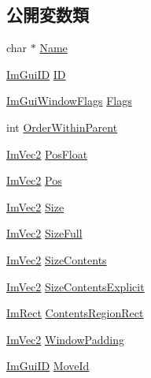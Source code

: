 \subsection*{公開変数類}
\begin{DoxyCompactItemize}
\item 
char $\ast$ \mbox{\hyperlink{struct_im_gui_window_ab44252eb7d02d3f38249f5bac605037c}{Name}}
\item 
\mbox{\hyperlink{imgui_8h_a1785c9b6f4e16406764a85f32582236f}{Im\+Gui\+ID}} \mbox{\hyperlink{struct_im_gui_window_a5976b8d78bcc543ad7f23561f5cf0b8f}{ID}}
\item 
\mbox{\hyperlink{imgui_8h_a0b8e067ab4f7a818828c8d89e531addc}{Im\+Gui\+Window\+Flags}} \mbox{\hyperlink{struct_im_gui_window_a7c29e810a533b9a647cce5d93d45057f}{Flags}}
\item 
int \mbox{\hyperlink{struct_im_gui_window_a81cb24c35445e1259367284701253c79}{Order\+Within\+Parent}}
\item 
\mbox{\hyperlink{struct_im_vec2}{Im\+Vec2}} \mbox{\hyperlink{struct_im_gui_window_a84170962470c8078195dad980cdfc1c0}{Pos\+Float}}
\item 
\mbox{\hyperlink{struct_im_vec2}{Im\+Vec2}} \mbox{\hyperlink{struct_im_gui_window_a1453f685401a44f76256fb54a4aac451}{Pos}}
\item 
\mbox{\hyperlink{struct_im_vec2}{Im\+Vec2}} \mbox{\hyperlink{struct_im_gui_window_a876e7aaf4cd824c8956238fba61387d5}{Size}}
\item 
\mbox{\hyperlink{struct_im_vec2}{Im\+Vec2}} \mbox{\hyperlink{struct_im_gui_window_ac3c7eb6b9cd556d56210cbb37caf0c74}{Size\+Full}}
\item 
\mbox{\hyperlink{struct_im_vec2}{Im\+Vec2}} \mbox{\hyperlink{struct_im_gui_window_a71097695729bf257ccaea824caf306a0}{Size\+Contents}}
\item 
\mbox{\hyperlink{struct_im_vec2}{Im\+Vec2}} \mbox{\hyperlink{struct_im_gui_window_a329d19a8805352b3a116e75e217d2155}{Size\+Contents\+Explicit}}
\item 
\mbox{\hyperlink{struct_im_rect}{Im\+Rect}} \mbox{\hyperlink{struct_im_gui_window_ac0d04b743eab132900c1ededc8eab9f6}{Contents\+Region\+Rect}}
\item 
\mbox{\hyperlink{struct_im_vec2}{Im\+Vec2}} \mbox{\hyperlink{struct_im_gui_window_a538d3d70ad8f71a4ec58a6a0560b2f02}{Window\+Padding}}
\item 
\mbox{\hyperlink{imgui_8h_a1785c9b6f4e16406764a85f32582236f}{Im\+Gui\+ID}} \mbox{\hyperlink{struct_im_gui_window_a680ac2168da85f59c35de8f0813224d6}{Move\+Id}}
\item 

\end{DoxyCompactItemize}
